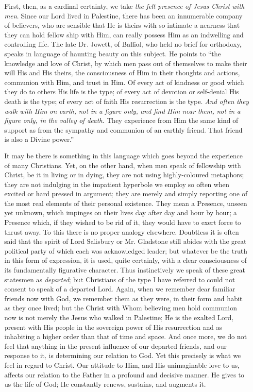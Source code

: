 \documentclass[12pt,a5paper,oneside]{book}
\begin{document}
First, then, as a cardinal certainty, we take
\textit{the felt presence of Jesus Christ with men}.
Since our Lord lived in Palestine, there has
been an innumerable company of believers,
who are sensible that He is theirs with so
intimate a nearness that they can hold fellow
ship with Him, can really possess Him as
an indwelling and controlling life. The late
Dr. Jowett, of Balliol, who held no brief for
orthodoxy, speaks in language of haunting
beauty on this subject. He points to ``the
knowledge and love of Christ, by which men
pass out of themselves to make their will His
and His theirs, the consciousness of Him in
their thoughts and actions, communion with
Him, and trust in Him. Of every act of kindness 
or good which they do to others His life
is the type; of every act of devotion or self-denial
His death is the type; of every act of
faith His resurrection is the type. \textit{And often
they walk with Him on earth, not in a figure only,
and find Him near them, not in a figure only,
in the valley of death.} They experience from
Him the same kind of support as from the
sympathy and communion of an earthly friend.
That friend is also a Divine power.''

It may be there is something in this language
which goes beyond the experience of many
Christians. Yet, on the other hand, when men
speak of fellowship with Christ, be it in living
or in dying, they are not using highly-coloured
metaphors; they are not indulging in the
impatient hyperbole we employ so often when
excited or hard pressed in argument; they
are merely and simply reporting one of the most
real elements of their personal existence. They
mean a Presence, unseen yet unknown, which
impinges on their lives day after day and hour
by hour; a Presence which, if they wished to
be rid of it, they would have to exert force
to thrust away. To this there is no proper
analogy elsewhere. Doubtless it is often said
that the spirit of Lord Salisbury or Mr.
Gladstone still abides with the great political 
party of which each was acknowledged
leader; but whatever be the truth in this form
of expression, it is used, quite certainly, with
a clear consciousness of its fundamentally figurative 
character. Thus instinctively we speak of
these great statesmen as \textit{departed}; but Christians 
of the type I have referred to could not consent 
to speak of a departed Lord. Again, when we
remember dear familiar friends now with God,
we remember them as they were, in their form
and habit as they once lived; but the Christ
with Whom believing men hold communion now
is not merely the Jesus who walked in Palestine;
He is the exalted Lord, present with His people
in the sovereign power of His resurrection and
as inhabiting a higher order than that of time
and space. And once more, we do not feel
that anything in the present influence of our
departed friends, and our response to it, is
determining our relation to God. Yet this
precisely is what we feel in regard to Christ.
Our attitude to Him, and His unimaginable
love to us, affects our relation to the Father
in a profound and decisive manner. He gives
to us the life of God; He constantly renews,
sustains, and augments it.
\end{document}
